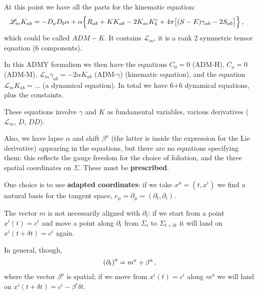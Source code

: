 \documentclass[main.tex]{subfiles}
\begin{document}

At this point we have all the parts for the kinematic equation: 
%
\begin{align}
\mathscr{L}_m K_{ab} 
&= - D_a D_b \alpha + \alpha \qty{ 
    R_{ab} + K K_{ab} - 2 K_{ac} K^{c}_b + 4 \pi \qty[(S-E) \gamma_{ab} - 2 S_{ab}] }
\,,
\end{align}
%
which could be called \(ADM-K\). It contains \(\mathscr{L}_m\), it is a rank 2 symmetric tensor equation (6 components). 

In this ADMY formalism we then have the equations \(C_0 = 0\) (ADM-H), \(C_a = 0\) (ADM-M), \(\mathscr{L}_m \gamma_{ab} = - 2 \alpha K_{ab}\) (ADM-\(\gamma \)) (kinematic equation), and the equation \(\mathscr{L}_m K_{ab} = \dots\) (a dynamical equation). 
In total we have 6+6 dynamical equations, plus the constaints.

These equations involve \(\gamma \) and \(K\) as fundamental variables, various derivatives (\(\mathscr{L}_m\), \(D\), \(DD\)). 

Also, we have lapse \(\alpha \) and shift \(\beta^{a}\) (the latter is inside the expression for the Lie derivative) appearing in the equations, but there are no equations specifying them: this reflects the gauge freedom for the choice of foliation, and the three spatial coordinates on \(\Sigma \). 
These must be \textbf{prescribed}. 

One choice is to use \textbf{adapted coordinates}: if we take \(x^{\mu } = (t, x^{i})\) we find a natural basis for the tangent space, \(e_\mu = \partial_{\mu } = (\partial_{t}, \partial_{i})\). 

The vector \(m\) is not necessarily aligned with \(\partial_{t}\): if we start from a point \(x^{i} (t) = c^{i}\) and move a point along \(\partial_{t}\) from \(\Sigma _t\) to \(\Sigma _{t + \delta t}\) it will land on \(x^{i} (t + \delta t) = c^{i}\) again. 

In general, though, 
%
\begin{align}
\qty(\partial_{t})^{a} = m^a + \beta^{a}
\,,
\end{align}
%
where the vector \(\beta^{a}\) is spatial; if we move from \(x^{i}(t)= c^{i}\) along \(m^a\) we will land on \(x^{i}(t + \delta t) = c^{i} - \beta^{i} \delta t\). 
\end{document}
